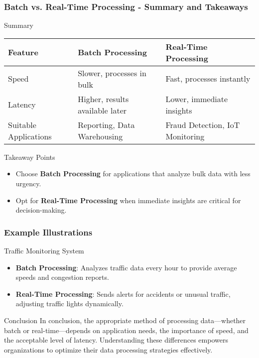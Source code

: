 \documentclass[aspectratio=169]{beamer}
\begin{document}
\begin{frame}[fragile]
    \frametitle{Batch vs. Real-Time Processing - Summary and Takeaways}
    \begin{block}{Summary}
        \begin{tabular}{|l|l|l|}
            \hline
            Feature & Batch Processing & Real-Time Processing \\
            \hline
            Speed & Slower, processes in bulk & Fast, processes instantly \\
            \hline
            Latency & Higher, results available later & Lower, immediate insights \\
            \hline
            Suitable Applications & Reporting, Data Warehousing & Fraud Detection, IoT Monitoring \\
            \hline
        \end{tabular}
    \end{block}
    
    \begin{block}{Takeaway Points}
        \begin{itemize}
            \item Choose \textbf{Batch Processing} for applications that analyze bulk data with less urgency.
            \item Opt for \textbf{Real-Time Processing} when immediate insights are critical for decision-making.
        \end{itemize}
    \end{block}
\end{frame}

\begin{frame}[fragile]
    \frametitle{Example Illustrations}
    \begin{block}{Traffic Monitoring System}
        \begin{itemize}
            \item \textbf{Batch Processing}: Analyzes traffic data every hour to provide average speeds and congestion reports.
            \item \textbf{Real-Time Processing}: Sends alerts for accidents or unusual traffic, adjusting traffic lights dynamically.
        \end{itemize}
    \end{block}
    
    \begin{block}{Conclusion}
        In conclusion, the appropriate method of processing data—whether batch or real-time—depends on application needs, the importance of speed, and the acceptable level of latency. Understanding these differences empowers organizations to optimize their data processing strategies effectively.
    \end{block}
\end{frame}
\end{document}
